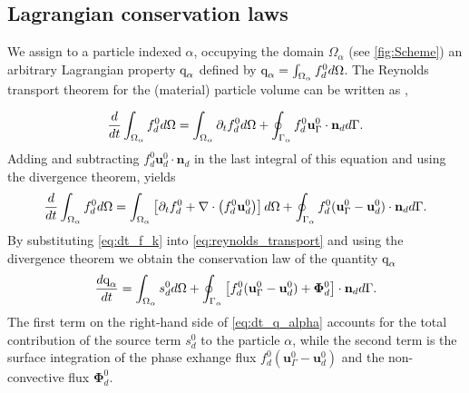 \subsection{Lagrangian conservation laws}
\label{subsec:Lcl}


We assign to a particle indexed $\alpha$, occupying the domain $\Omega_\alpha$ (see \ref{fig:Scheme}) an arbitrary Lagrangian property $\text q_\alpha$ defined by $\text q_\alpha  = \int_{\Omega_{\alpha}}  f_d^0 d\Omega$. The Reynolds transport theorem for the (material) particle volume can be written as \citep{leal2007advanced},

\begin{equation}
   \ddt  \intO{f_d^0}
    = \intO{\pddt f_d^0 }\\
    + \intS{ f_d^0 \textbf{u}_\Gamma^0\cdot \textbf{n}_d }.
    \label{eq:reynolds_transport0}
\end{equation}
Adding and subtracting $f_d^0 \textbf{u}_d^0\cdot \textbf{n}_d$ in the last integral of this equation and using the divergence theorem, yields
\begin{equation}
    \ddt  \intO{f_d^0}
    = \intO{\left[ \pddt f_d^0 + \div\left(f_d^0\textbf{u}_d^0\right) \right]}\\
    + \intS{ f_d^0 (\textbf{u}_\Gamma^0-\textbf{u}_d^0)\cdot \textbf{n}_d }.
    \label{eq:reynolds_transport}
\end{equation}
By substituting \ref{eq:dt_f_k} into \ref{eq:reynolds_transport} and using the divergence theorem we obtain the conservation law of the quantity $\text q_\alpha$ %
\begin{equation}
    \frac{d \text q_\alpha}{d t}
    = \intO{ s_d^0 }
    + \intS{ \left[
        f_d^0 (\textbf{u}_\Gamma^0-\textbf{u}_d^0) 
        + \mathbf{\Phi}_d^0 
        \right] \cdot \textbf{n}_d }.
    \label{eq:dt_q_alpha}
\end{equation}
The first term on the right-hand side of \ref{eq:dt_q_alpha} accounts for the total contribution of the source term $s_d^0$ to the particle $\alpha$,
while the second term is the surface integration of the phase exhange flux $f_d^0 (\textbf{u}_\Gamma^0-\textbf{u}_d^0)$ and the non-convective flux $\mathbf{\Phi}_d^0$.

